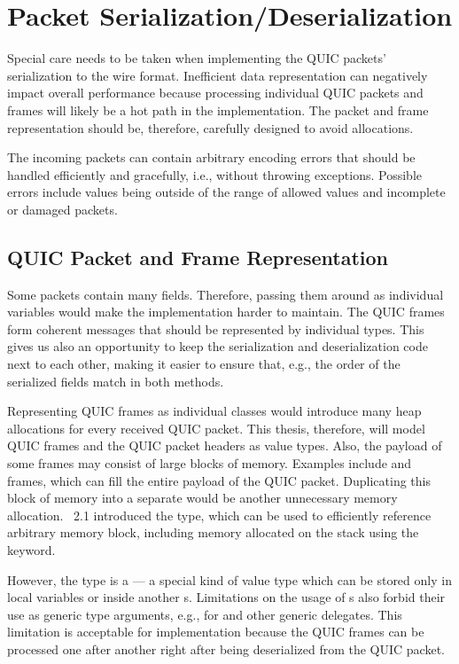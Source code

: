 \section{Packet Serialization/Deserialization}

Special care needs to be taken when implementing the QUIC packets' serialization to the wire format.
Inefficient data representation can negatively impact overall performance because processing
individual QUIC packets and frames will likely be a hot path in the implementation. The packet and
frame representation should be, therefore, carefully designed to avoid allocations.

The incoming packets can contain arbitrary encoding errors that should be handled efficiently and
gracefully, i.e., without throwing exceptions. Possible errors include values being outside of the
range of allowed values and incomplete or damaged packets.

\subsection{QUIC Packet and Frame Representation}\label{sec:03-data-representation}

Some packets contain many fields. Therefore, passing them around as individual variables would make
the implementation harder to maintain. The QUIC frames form coherent messages that should be
represented by individual \dotnet{} types. This gives us also an opportunity to keep the
serialization and deserialization code next to each other, making it easier to ensure that, e.g.,
the order of the serialized fields match in both methods.

Representing QUIC frames as individual classes would introduce many heap allocations for every
received QUIC packet. This thesis, therefore, will model QUIC frames and the QUIC packet headers as
value types. Also, the payload of some frames may consist of large blocks of memory. Examples
include \STREAM{} and \CRYPTO{} frames, which can fill the entire payload of the QUIC packet.
Duplicating this block of memory into a separate \ArrayOf{\Byte{}} would be another unnecessary
memory allocation. \dotnet{}~2.1 introduced the  type, which can be used to
efficiently reference arbitrary memory block, including memory allocated on the stack using the
 keyword.

However, the  type is a  --- a special kind of value type
which can be stored only in local variables or inside another s. Limitations on
the usage of s also forbid their use as generic type arguments, e.g., for
\FuncOf{} and other generic delegates. This limitation is acceptable for \QuicConnection{}
implementation because the QUIC frames can be processed one after another right after being
deserialized from the QUIC packet.

